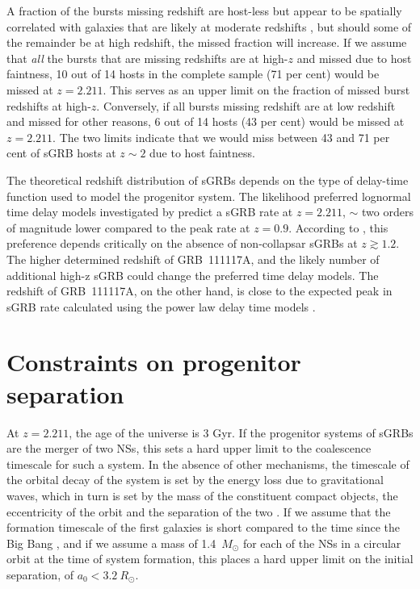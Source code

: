 \documentclass{aa}    %
\begin{document}
A fraction of the bursts missing redshift are host-less but appear to be
spatially correlated with galaxies that are likely at moderate redshifts
\citep{Tunnicliffe2014}, but should some of the remainder be at high redshift,
the missed fraction will increase. If we assume that \textit{all} the bursts
that are missing redshifts are at high-$z$ and missed due to host faintness, 10
out of 14 hosts in the complete sample (71 per cent) would be missed at $z =
2.211$. This serves as an upper limit on the fraction of missed burst redshifts
at high-$z$. Conversely, if all bursts missing redshift are at low redshift and
missed for other reasons, 6 out of 14 hosts (43 per cent) would be missed at $z
= 2.211$. The two limits indicate that we would miss between 43 and 71 per cent
of sGRB hosts at $z \sim 2$ due to host faintness.

The theoretical redshift distribution of sGRBs depends on the type of delay-time
function used to model the progenitor system. The likelihood preferred lognormal
time delay models investigated by \citet{Wanderman2015} predict a sGRB rate at
$z = 2.211$, $\sim$ two orders of magnitude lower compared to the peak rate at
$z = 0.9$. According to \citet{Wanderman2015}, this preference depends
critically on the absence of non-collapsar sGRBs at $z \gtrsim 1.2$. The higher
determined redshift of GRB~111117A, and the likely number of additional high-z
sGRB could change the preferred time delay models. The redshift of GRB~111117A,
on the other hand, is close to the expected peak in sGRB rate calculated using
the power law delay time models \citep{Behroozi2014, Wanderman2015}.


\section{Constraints on progenitor separation}

At $z = 2.211$, the age of the universe is 3 Gyr. If the progenitor systems of
sGRBs are the merger of two NSs, this sets a hard upper limit to the coalescence
timescale for such a system. In the absence of other mechanisms, the timescale
of the orbital decay of the system is set by the energy loss due to
gravitational waves, which in turn is set by the mass of the constituent compact
objects, the eccentricity of the orbit and the separation of the two \citep{Postnov2014}. If we assume that the
formation timescale of the first galaxies is short compared to the time since
the Big Bang \citep{Richard2011}, and if we assume a mass of 1.4~$M_\odot$ for
each of the NSs in a circular orbit at the time of system formation, this places
a hard upper limit on the initial separation, of $a_0 < 3.2~R_\odot$.
\end{document}
